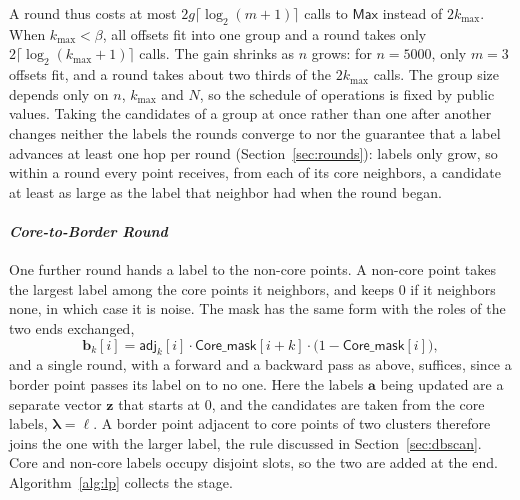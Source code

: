 A round thus costs at most $2g \lceil \log_2(m+1) \rceil$ calls to
$\mathsf{Max}$ instead of $2k_{\max}$. When $k_{\max} < \beta$, all
offsets fit into one group and a round takes only
$2\lceil \log_2(k_{\max}+1) \rceil$ calls. The gain shrinks as $n$ grows:
for $n = 5000$, only $m = 3$ offsets fit, and a round takes about two
thirds of the $2k_{\max}$ calls. The group size depends only on $n$,
$k_{\max}$ and $N$, so the schedule of operations is fixed by public
values. Taking the candidates of a group at once rather than one after
another changes neither the labels the rounds converge to nor the
guarantee that a label advances at least one hop per round
(Section~\ref{sec:rounds}): labels only grow, so within a round every
point receives, from each of its core neighbors, a candidate at least as
large as the label that neighbor had when the round began.

\paragraph{\emph{Core-to-Border Round}}
One further round hands a label to the non-core points. A non-core point
takes the largest label among the core points it neighbors, and keeps $0$
if it neighbors none, in which case it is noise. The mask has the same
form with the roles of the two ends exchanged,
\begin{equation}
  \label{eq:border}
  \mathbf{b}_k[i] = \mathsf{adj}_k[i] \cdot \mathsf{Core\_mask}[i+k]
    \cdot \bigl( 1 - \mathsf{Core\_mask}[i] \bigr),
\end{equation}
and a single round, with a forward and a backward pass as above,
suffices, since a border point passes its label on to no one. Here the
labels $\mathbf{a}$ being updated are a separate vector $\mathbf{z}$ that
starts at $0$, and the candidates are taken from the core labels,
$\boldsymbol{\lambda} = \boldsymbol{\ell}$. A border point adjacent to
core points of two clusters therefore joins the one with the larger
label, the rule discussed in Section~\ref{sec:dbscan}. Core and non-core
labels occupy disjoint slots, so the two are added at the end.
Algorithm~\ref{alg:lp} collects the stage.

